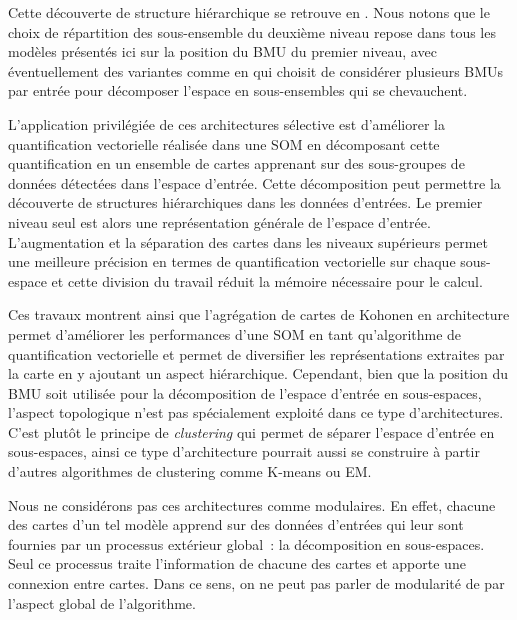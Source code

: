\documentclass[../main]{subfiles}
\begin{document}
Cette découverte de structure hiérarchique se retrouve en \cite{ordonez_hierarchical_2010,dittenbach_growing_2000}.
Nous notons que le choix de répartition des sous-ensemble du deuxième niveau repose dans tous les modèles présentés ici sur la position du BMU du premier niveau, avec éventuellement des variantes comme en \cite{suganthan_pattern_2001} qui choisit de considérer plusieurs BMUs par entrée pour décomposer l'espace en sous-ensembles qui se chevauchent.

L'application privilégiée de ces architectures sélective est d'améliorer la quantification vectorielle réalisée dans une SOM en décomposant cette quantification en un ensemble de cartes apprenant sur des sous-groupes de données détectées dans l'espace d'entrée.
Cette décomposition peut permettre la découverte de structures hiérarchiques dans les données d'entrées.
Le premier niveau seul est alors une représentation générale de l'espace d'entrée. L'augmentation et la séparation des cartes dans les niveaux supérieurs permet une meilleure précision en termes de quantification vectorielle sur chaque sous-espace et cette division du travail réduit la mémoire nécessaire pour le calcul.

Ces travaux montrent ainsi que l'agrégation de cartes de Kohonen en architecture permet d'améliorer les performances d'une SOM en tant qu'algorithme de quantification vectorielle et permet de diversifier les représentations extraites par la carte en y ajoutant un aspect hiérarchique.
Cependant, bien que la position du BMU soit utilisée pour la décomposition de l'espace d'entrée en sous-espaces, l'aspect topologique n'est pas spécialement exploité dans ce type d'architectures. C'est plutôt le principe de \emph{clustering} qui permet de séparer l'espace d'entrée en sous-espaces, ainsi ce type d'architecture pourrait aussi se construire à partir d'autres algorithmes de clustering comme K-means ou EM.

Nous ne considérons pas ces architectures comme modulaires.
En effet, chacune des cartes d'un tel modèle apprend sur des données d'entrées qui leur sont fournies par un processus extérieur global~: la décomposition en sous-espaces. Seul ce processus traite l'information de chacune des cartes et apporte une connexion entre cartes. Dans ce sens, on ne peut pas parler de modularité de par l'aspect global de l'algorithme. 
\end{document}
